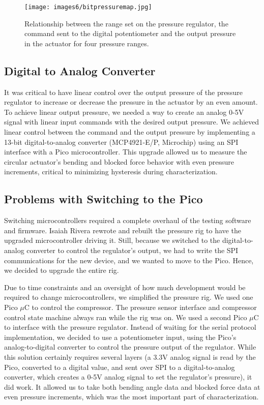 \begin{figure}[ht]
    \centering
    \texttt{[image: images6/bitpressuremap.jpg]}
    \caption{Relationship between the range set on the pressure regulator, the command sent to the digital potentiometer and the output pressure in the actuator for four pressure ranges.}
    \label{fig:bitpressuremap}
\end{figure}

\subsection{Digital to Analog Converter}

It was critical to have linear control over the output pressure of the pressure regulator to increase or decrease the pressure in the actuator by an even amount. To achieve linear output pressure, we needed a way to create an analog 0-5V signal with linear input commands with the desired output pressure. We achieved linear control between the command and the output pressure by implementing a 13-bit digital-to-analog converter (MCP4921-E/P, Microchip) using an SPI interface with a Pico microcontroller. This upgrade allowed us to measure the circular actuator's bending and blocked force behavior with even pressure increments, critical to minimizing hysteresis during characterization. 

\subsection{Problems with Switching to the Pico}

Switching microcontrollers required a complete overhaul of the testing software and firmware. Isaiah Rivera rewrote and rebuilt the pressure rig to have the upgraded microcontroller driving it. Still, because we switched to the digital-to-analog converter to control the regulator's output, we had to write the SPI communications for the new device, and we wanted to move to the Pico. Hence, we decided to upgrade the entire rig. 

Due to time constraints and an oversight of how much development would be required to change microcontrollers, we simplified the pressure rig. We used one Pico $\mu$C to control the compressor. The pressure sensor interface and compressor control state machine always ran while the rig was on. We used a second Pico $\mu$C to interface with the pressure regulator. Instead of waiting for the serial protocol implementation, we decided to use a potentiometer input, using the Pico's analog-to-digital converter to control the pressure output of the regulator. While this solution certainly requires several layers (a 3.3V analog signal is read by the Pico, converted to a digital value, and sent over SPI to a digital-to-analog converter, which creates a 0-5V analog signal to set the regulator's pressure), it did work. It allowed us to take both bending angle data and blocked force data at even pressure increments, which was the most important part of characterization. 

